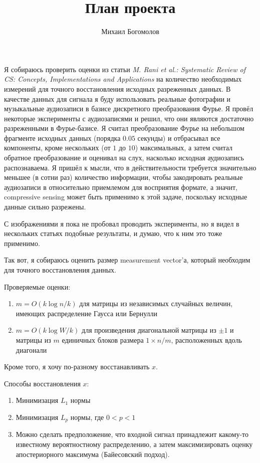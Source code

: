 \documentclass{article}
\begin{document}
\author{Михаил Богомолов}
\title{План проекта}
\maketitle

Я собираюсь проверить оценки из статьи \textit{M. Rani et al.: Systematic Review of CS: Concepts, Implementations and Applications} на количество необходимых измерений для точного восстановления исходных разреженных данных. В качестве данных для сигнала я буду использовать реальные фотографии и музыкальные аудиозаписи в базисе дискретного преобразования Фурье. Я провёл некоторые эксперименты с аудиозаписями и решил, что они являются достаточно разреженными в Фурье-базисе. Я считал преобразование Фурье на небольшом фрагменте исходных данных (порядка $0.05$ секунды) и отбрасывал все компоненты, кроме нескольких (от $1$ до $10$) максимальных, а затем считал обратное преобразование и оценивал на слух, насколько исходная аудиозапись распознаваема. Я пришёл к мысли, что в действительности требуется значительно меньшее (в сотни раз) количество информации, чтобы закодировать реальные аудиозаписи в относительно приемлемом для восприятия формате, а значит, compressive sensing может быть применимо к этой задаче, поскольку исходные данные сильно разрежены. 

С изображениями я пока не пробовал проводить эксперименты, но я видел в нескольких статьях подобные результаты, и думаю, что к ним это тоже применимо. 

Так вот, я собираюсь оценить размер measurement vector'а, который необходим для точного восстановления данных.

Проверяемые оценки:
\begin{enumerate}
	\item $ m = O(k\log{n/k})$ для матрицы из независимых случайных величин, имеющих распределение Гаусса или Бернулли
	\item $ m = O(k\log{W/k})$ для произведения диагональной матрицы из $\pm 1$ и матрицы из $m$ единичных блоков размера $1 \times n/m$, расположенных вдоль диагонали
\end{enumerate}

Кроме того, я хочу по-разному восстанавливать $x$.

Способы восстановления $x$:
\begin{enumerate}
	\item Минимизация $L_1$ нормы
	\item Минимизация $L_p$ нормы, где $0 < p < 1$
	\item Можно сделать предположение, что входной сигнал принадлежит какому-то известному вероятностному распределению, а затем максимизировать оценку апостериорного максимума (Байесовский подход).
\end{enumerate}
\end{document}
